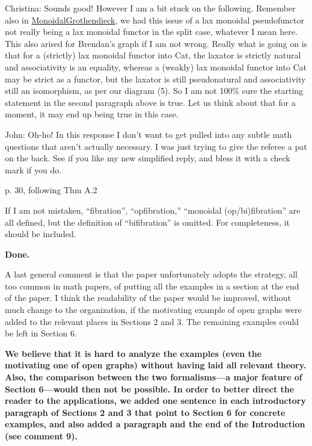 \documentclass[reqno]{amsart}
\def\chris{\color{purple} Christina: }
\def\john{\color{red} John: }
\begin{document}
\begin{enumerate}
{{\chris Sounds good! However I am a bit stuck on the following. Remember also in 
\href{https://thalis.math.upatras.gr/~cvasilak/documents/MonGroth.pdf}{MonoidalGrothendieck}, we had this issue of a lax monoidal pseudofunctor not 
really being a lax monoidal functor in the split case, whatever I mean here. This also arised for Brendan's graph if I am not wrong. Really what is 
going on is that for a (strictly) lax monoidal functor into Cat, the laxator is strictly natural and associativity is an equality, whereas a (weakly) 
lax monoidal functor into Cat may be strict as a functor, but the laxator is still pseudonatural and associativity still an isomorphism, as per our 
diagram (5). So I am not 100\% sure the starting statement in the second paragraph above is true. Let us think about that for a moment, it may end up 
being true in this case.}

{\john  Oh-ho!  In this response I don't want to get pulled into any subtle math questions that aren't  actually necessary.  I was just trying to give 
the referee a pat on the back.  See if you like my new simplified reply, and bless it with a check mark if you do.}
\fi

\item p. 30, following Thm A.2

If I am not mistaken, “fibration”, “opfibration,” “monoidal (op/bi)fibration” are all defined, but the definition of “bifibration” is omitted. For 
completeness, it should be included.

{\bf Done.} 

  

\item A last general comment is that the paper unfortunately adopts the strategy, all too common in math papers, of putting all the examples in a 
section at 
the end of the paper. I think the readability of the paper would be improved, without much change to the organization, if the motivating example of 
open graphs were added to the relevant places in Sections 2 and 3. The remaining examples could be left in Section 6.

{\bf We believe that it is hard to analyze the examples (even the motivating one of open graphs) without having laid all relevant theory. Also, 
the comparison between the two formalisms---a major feature of Section 6---would then not be possible. In order to 
better direct the reader to the applications, we added one sentence in each introductory paragraph of Sections 2 and 3 that point to Section 6 for 
concrete examples, and also added a paragraph and the end of the Introduction (see comment 9). } 

}
\end{enumerate}
\end{document}
